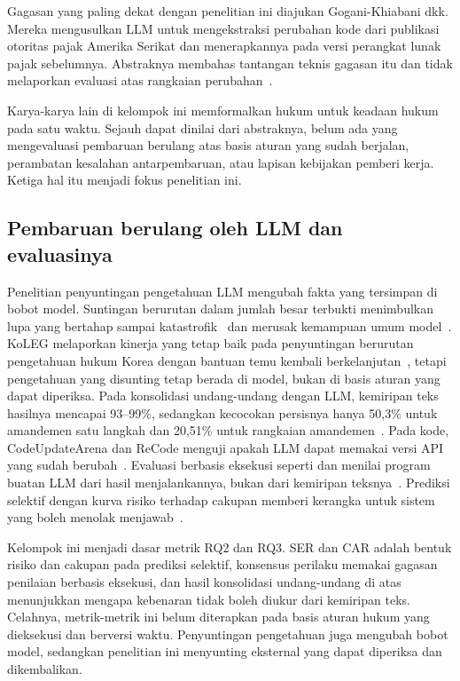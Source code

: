 Gagasan yang paling dekat dengan penelitian ini diajukan Gogani-Khiabani dkk. Mereka mengusulkan LLM untuk mengekstraksi perubahan kode dari publikasi otoritas pajak Amerika Serikat dan menerapkannya pada versi perangkat lunak pajak sebelumnya. Abstraknya membahas tantangan teknis gagasan itu dan tidak melaporkan evaluasi atas rangkaian perubahan~\cite{goganikhiabani2025maintaining}.

Karya-karya lain di kelompok ini memformalkan hukum untuk keadaan hukum pada satu waktu. Sejauh dapat dinilai dari abstraknya, belum ada yang mengevaluasi pembaruan berulang atas basis aturan yang sudah berjalan, perambatan kesalahan antarpembaruan, atau lapisan kebijakan pemberi kerja. Ketiga hal itu menjadi fokus penelitian ini.

\subsection{Pembaruan berulang oleh LLM dan evaluasinya}
\label{subsec:pembaruan-llm}

Penelitian penyuntingan pengetahuan LLM mengubah fakta yang tersimpan di bobot model. Suntingan berurutan dalam jumlah besar terbukti menimbulkan lupa yang bertahap sampai katastrofik~\cite{gupta2024forgetting} dan merusak kemampuan umum model~\cite{gu2024harms}. KoLEG melaporkan kinerja yang tetap baik pada penyuntingan berurutan pengetahuan hukum Korea dengan bantuan temu kembali berkelanjutan~\cite{seo2025koleg}, tetapi pengetahuan yang disunting tetap berada di model, bukan di basis aturan yang dapat diperiksa. Pada konsolidasi undang-undang dengan LLM, kemiripan teks hasilnya mencapai 93--99\%, sedangkan kecocokan persisnya hanya 50,3\% untuk amandemen satu langkah dan 20,51\% untuk rangkaian amandemen~\cite{prior2025risks}. Pada kode, CodeUpdateArena dan ReCode menguji apakah LLM dapat memakai versi API yang sudah berubah~\cite{liu2024codeupdatearena,wu2026recode}. Evaluasi berbasis eksekusi seperti  dan  menilai program buatan LLM dari hasil menjalankannya, bukan dari kemiripan teksnya~\cite{chen2021evaluating,li2022alphacode}. Prediksi selektif dengan kurva risiko terhadap cakupan memberi kerangka untuk sistem yang boleh menolak menjawab~\cite{geifman2017selective}.

Kelompok ini menjadi dasar metrik RQ2 dan RQ3. SER dan CAR adalah bentuk risiko dan cakupan pada prediksi selektif, konsensus perilaku memakai gagasan penilaian berbasis eksekusi, dan hasil konsolidasi undang-undang di atas menunjukkan mengapa kebenaran tidak boleh diukur dari kemiripan teks. Celahnya, metrik-metrik ini belum diterapkan pada basis aturan hukum yang dieksekusi dan berversi waktu. Penyuntingan pengetahuan juga mengubah bobot model, sedangkan penelitian ini menyunting  eksternal yang dapat diperiksa dan dikembalikan.

